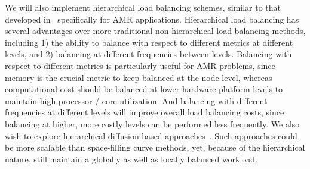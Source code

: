 \documentclass[11pt,letterpaper]{article}
\begin{document}

%
We will also implement hierarchical load balancing schemes, similar to
that developed in~\cite{LaTa06} specifically for AMR applications.
Hierarchical load balancing has several advantages over more
traditional non-hierarchical load balancing methods, including 1) the
ability to balance with respect to different metrics at different
levels, and 2) balancing at different frequencies between levels.
Balancing with respect to different metrics is particularly useful for
AMR problems, since memory is the crucial metric to keep balanced at
the node level, whereas computational cost should be balanced at lower
hardware platform levels to maintain high processor / core
utilization.  And balancing with different frequencies at different
levels will improve overall load balancing costs, since balancing at
higher, more costly levels can be performed less frequently.  We also
wish to explore hierarchical diffusion-based approaches~\cite{ScKa97}.
Such approaches could be more scalable than space-filling curve
methods, yet, because of the hierarchical nature, still maintain a
globally as well as locally balanced workload.

% 
\end{document}

